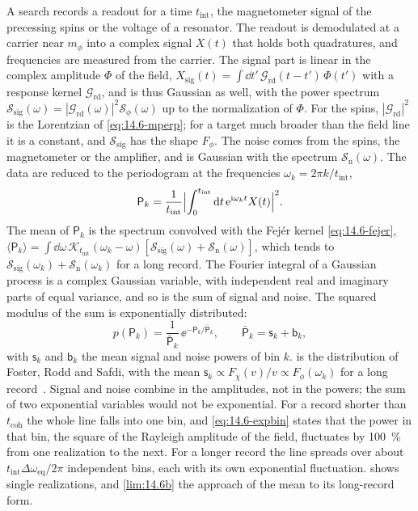 A search records a readout for a time $t_{\mathrm{int}}$, the magnetometer signal of the precessing spins or the voltage of a resonator. The readout is demodulated at a carrier near $m_\phi$ into a complex signal $X(t)$ that holds both quadratures, and frequencies are measured from the carrier. The signal part is linear in the complex amplitude $\Phi$ of the field, $X_{\mathrm{sig}}(t) = \int\dd t'\,\mathcal{G}_{\mathrm{rd}}(t - t')\,\Phi(t')$ with a response kernel $\mathcal{G}_{\mathrm{rd}}$, and is thus Gaussian as well, with the power spectrum $\mathcal{S}_{\mathrm{sig}}(\omega) = |\mathcal{G}_{\mathrm{rd}}(\omega)|^2\mathcal{S}_\phi(\omega)$ up to the normalization of $\Phi$. For the spins, $|\mathcal{G}_{\mathrm{rd}}|^2$ is the Lorentzian of \cref{eq:14.6-mperp}; for a target much broader than the field line it is a constant, and $\mathcal{S}_{\mathrm{sig}}$ has the shape $F_\phi$. The noise comes from the spins, the magnetometer or the amplifier, and is Gaussian with the spectrum $\mathcal{S}_{\mathrm{n}}(\omega)$. The data are reduced to the periodogram at the frequencies $\omega_k = 2\pi k/t_{\mathrm{int}}$,
\begin{equation*}
  \mathsf{P}_k = \frac{1}{t_{\mathrm{int}}}\Bigl|\int_0^{t_{\mathrm{int}}}\mathrm{d} t\,\mathrm{e}^{\mathrm{i}\omega_kt}X(t)\Bigr|^2 .
\end{equation*}
The mean of $\mathsf{P}_k$ is the spectrum convolved with the Fejér kernel \cref{eq:14.6-fejer}, $\langle\mathsf{P}_k\rangle = \int\dd\omega\,\mathcal{K}_{t_{\mathrm{int}}}(\omega_k - \omega)[\mathcal{S}_{\mathrm{sig}}(\omega) + \mathcal{S}_{\mathrm{n}}(\omega)]$, which tends to $\mathcal{S}_{\mathrm{sig}}(\omega_k) + \mathcal{S}_{\mathrm{n}}(\omega_k)$ for a long record. The Fourier integral of a Gaussian process is a complex Gaussian variable, with independent real and imaginary parts of equal variance, and so is the sum of signal and noise. The squared modulus of the sum is exponentially distributed:
\begin{equation}
  p(\mathsf{P}_k) = \frac{1}{\bar{\mathsf{P}}_k}\,\ee^{-\mathsf{P}_k/\bar{\mathsf{P}}_k}, \qquad \bar{\mathsf{P}}_k = \mathsf{s}_k + \mathsf{b}_k ,
  \label{eq:14.6-expbin}
\end{equation}
with $\mathsf{s}_k$ and $\mathsf{b}_k$ the mean signal and noise powers of bin $k$.  is the distribution of Foster, Rodd and Safdi, with the mean $\mathsf{s}_k \propto F_\chi(v)/v \propto F_\phi(\omega_k)$ for a long record~\cite[Eq.~(24)]{foster2018revealing}. Signal and noise combine in the amplitudes, not in the powers; the sum of two exponential variables would not be exponential. For a record shorter than $t_{\mathrm{coh}}$ the whole line falls into one bin, and \cref{eq:14.6-expbin} states that the power in that bin, the square of the Rayleigh amplitude of the field, fluctuates by \SI{100}{\percent} from one realization to the next. For a longer record the line spreads over about $t_{\mathrm{int}}\Delta\omega_{\mathrm{eq}}/2\pi$ independent bins, each with its own exponential fluctuation.  shows single realizations, and \cref{lim:14.6b} the approach of the mean to its long-record form.

